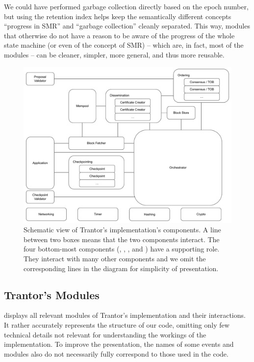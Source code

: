 \documentclass{article}
\begin{document}
We could have performed garbage collection directly based on the epoch number,
but using the retention index helps keep the semantically different concepts ``progress in SMR'' and ``garbage collection'' cleanly separated.
This way, modules that otherwise do not have a reason to be aware of the progress of the whole state machine (or even of the concept of SMR)
-- which are, in fact, most of the modules --
can be cleaner, simpler, more general, and thus more reusable.

\begin{figure}[h]
    \centering
    \includegraphics[width=\textwidth]{figures/implementation-diagram}
    \caption{Schematic view of Trantor's implementation's components.
    A line between two boxes means that the two components interact.
    The four bottom-most components (, , , and ) have a supporting role.
    They interact with many other components and we omit the corresponding lines in the diagram for simplicity of presentation.}
    \label{fig:implementation-diagram}
\end{figure}

\subsection{Trantor's Modules}

 displays all relevant modules of Trantor's implementation and their interactions.
It rather accurately represents the structure of our code, omitting only few technical details not relevant for understanding the workings of the implementation.
To improve the presentation, the names of some events and modules also do not necessarily fully correspond to those used in the code.
\end{document}
